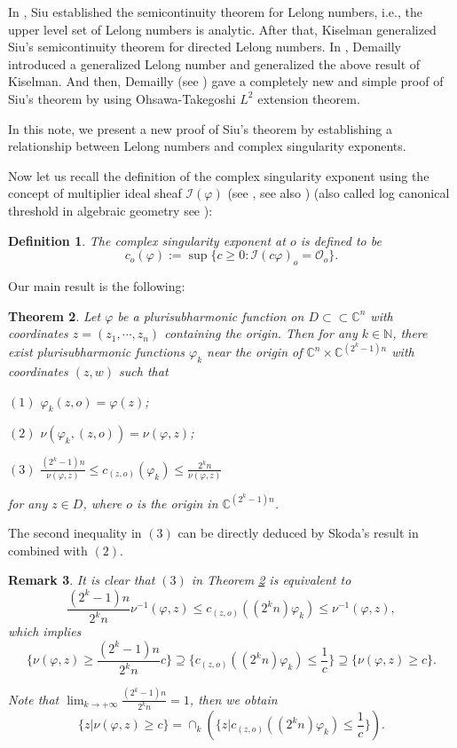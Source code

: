 \documentclass[reqno]{amsart}
\newtheorem{Theorem}{Theorem}[section]
\newtheorem{Definition}[Theorem]{Definition}
\newtheorem{Remark}[Theorem]{Remark}
\numberwithin{equation}{section}
\begin{document}
In \cite{siu74}, Siu established the semicontinuity theorem for Lelong numbers,
i.e.,
the upper level set of Lelong numbers is analytic.
After that,
Kiselman \cite{kisel86} generalized Siu's semicontinuity theorem for directed Lelong numbers.
In \cite{demailly87},
Demailly introduced a generalized Lelong number and generalized the above result of Kiselman.
And then,
Demailly (see \cite{demailly-book}) gave a completely new and simple proof of Siu's theorem
by using Ohsawa-Takegoshi $L^{2}$ extension theorem.

In this note,
we present a new proof of Siu's theorem by
establishing a relationship between Lelong numbers and complex singularity exponents.

Now let us recall the definition of the complex singularity exponent using the concept of multiplier ideal sheaf $\mathcal{I}(\varphi)$
(see \cite{tian87}, see also \cite{demailly-note2000,demailly-book}) (also called log canonical threshold in algebraic geometry see \cite{Sho92,Ko92}):
\begin{Definition}
\label{def:lct}
The complex singularity exponent at $o$ is defined to be
$$c_{o}(\varphi):=\sup\{c\geq0:\mathcal{I}(c\varphi)_{o}=\mathcal{O}_{o}\}.$$
\end{Definition}

Our main result is the following:

\begin{Theorem}
\label{thm:approx_lelong_lct}
Let $\varphi$ be a plurisubharmonic function on $D\subset\subset\mathbb{C}^{n}$ with coordinates $z=(z_{1},\cdots,z_{n})$ containing the origin.
Then for any $k\in\mathbb{N}$,
there exist plurisubharmonic functions $\varphi_{k}$ near the origin of $\mathbb{C}^{n}\times\mathbb{C}^{(2^{k}-1)n}$ with coordinates $(z,w)$
such that

$(1)$ $\varphi_{k}(z,o)=\varphi(z)$;

$(2)$ $\nu(\varphi_{k},(z,o))=\nu(\varphi,z)$;

$(3)$ $\frac{(2^{k}-1)n}{\nu(\varphi,z)}\leq c_{(z,o)}(\varphi_{k})\leq \frac{2^{k}n}{\nu(\varphi,z)}$

for any $z\in D$, where $o$ is the origin in $\mathbb{C}^{(2^{k}-1)n}$.
\end{Theorem}

The second inequality in $(3)$ can be directly deduced by Skoda's result in \cite{skoda72} combined with $(2)$.

\begin{Remark}
It is clear that $(3)$ in Theorem \ref{thm:approx_lelong_lct} is equivalent to
$$\frac{(2^{k}-1)n}{2^{k}n}\nu^{-1}(\varphi,z)\leq c_{(z,o)}((2^{k}n)\varphi_{k})\leq \nu^{-1}(\varphi,z),$$
which implies
$$\{\nu(\varphi,z)\geq \frac{(2^{k}-1)n}{2^{k}n}c\}\supseteq\{c_{(z,o)}((2^{k}n)\varphi_{k})\leq \frac{1}{c}\}\supseteq\{\nu(\varphi,z)\geq c\}.$$

Note that $\lim_{k\to+\infty}\frac{(2^{k}-1)n}{2^{k}n}=1$,
then we obtain
$$\{z|\nu(\varphi,z)\geq c\}=\cap_{k}(\{z|c_{(z,o)}((2^{k}n)\varphi_{k})\leq \frac{1}{c}\}).$$
\end{Remark}
\end{document}

